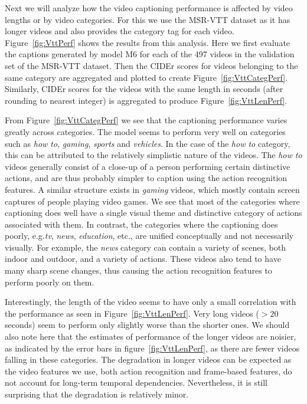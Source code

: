 Next we will analyze how the video captioning performance is affected by
video lengths or by video categories.
For this we use the MSR-VTT dataset as it has longer videos and also provides
the category tag for each video.
Figure~\ref{fig:VttPerf} shows the results from this analysis.
Here we first evaluate the captions generated by model M6 for each of the 497
videos in the validation set of the MSR-VTT dataset.
Then the CIDEr scores for videos belonging to the same category are aggregated
and plotted to create Figure~\ref{fig:VttCategPerf}.
Similarly, CIDEr scores for the videos with the same length in seconds (after
rounding to nearest integer) is aggregated to produce
Figure~\ref{fig:VttLenPerf}.

From Figure~\ref{fig:VttCategPerf} we see that the captioning performance varies
greatly across categories.
The model seems to perform very well on categories such as \emph{how to},
\emph{gaming},
\emph{sports} and \emph{vehicles}.
In the case of the \emph{how to} category, this can be attributed to the relatively
simplistic nature of the videos.
The \emph{how to} videos generally consist of a close-up of a person performing
certain distinctive actions, and are thus probably simpler to caption using the
action recognition features. 
A similar structure exists in \emph{gaming} videos, which mostly contain screen
captures of people playing video games.
We see that most of the categories where captioning does well have a single
visual theme and distinctive category of actions associated with them. 
In contrast, the categories where the captioning does poorly, e.g.\@ \emph{tv},
\emph{news}, \emph{education}, etc.\@, are unified conceptually and not necessarily
visually.
For example, the \emph{news} category can contain a variety of scenes, both
indoor and outdoor, and a variety of actions. 
These videos also tend to have many sharp scene changes, thus causing the action
recognition features to perform poorly on them.

Interestingly, the length of the video seems to have only a small correlation with
the performance as seen in Figure~\ref{fig:VttLenPerf}.
Very long videos ($>20$ seconds) seem to perform only slightly worse than the
shorter ones.
We should also note here that the estimates of performance of the longer videos
are noisier, as indicated by the error bars in figure~\ref{fig:VttLenPerf}, as
there are fewer videos falling in these categories. 
The degradation in longer videos can be expected as the video features we use,
both action recognition and frame-based features, do not account for long-term
temporal dependencies.
Nevertheless, it is still surprising that the degradation is relatively minor.

